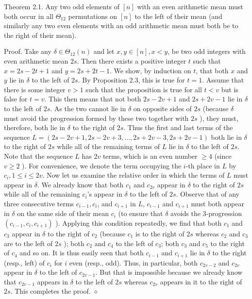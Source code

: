 \documentclass[10pt]{article}
\newcommand{\proofend}{\hfill\(\diamond\)}
\begin{document}
Theorem 2.1. Any two odd elements of $[n]$ with an even arithmetic mean must both occur in all $\Theta_{12}$ permutations on $[n]$ to the left of their mean (and similarly any two even elements with an odd arithmetic mean must both be to the right of their mean).

Proof. Take any $\delta \in \Theta_{12}(n)$ and let $x, y \in[n], x<y$, be two odd integers with even arithmetic mean $2 s$. Then there exists a positive integer $t$ such that $x=2 s-2 t+1$ and $y=2 s+2 t-1$. We show, by induction on $t$, that both $x$ and $y$ lie in $\delta$ to the left of $2 s$. By Proposition 2.3, this is true for $t=1$. Assume that there is some integer $v>1$ such that the proposition is true for all $t<v$ but is false for $t=v$. This then means that not both $2 s-2 v+1$ and $2 s+2 v-1$ lie in $\delta$ to the left of $2 s$. As the two cannot lie in $\delta$ on opposite sides of $2 s$ (because $\delta$ must avoid the progression formed by these two together with $2 s$ ), they must, therefore, both lie in $\delta$ to the right of $2 s$. Thus the first and last terms of the sequence $L=(2 s-2 v+1,2 s-2 v+3, \ldots, 2 s+2 v-3,2 s+2 v-1)$ both lie in $\delta$ to the right of $2 s$ while all of the remaining terms of $L$ lie in $\delta$ to the left of $2 s$. Note that the sequence $L$ has $2 v$ terms, which is an even number $\geq 4$ (since $v \geq 2$ ). For convenience, we denote the term occupying the $i$-th place in $L$ by $c_{i}, 1 \leq i \leq 2 v$. Now let us examine the relative order in which the terms of $L$ must appear in $\delta$. We already know that both $c_{1}$ and $c_{2 v}$ appear in $\delta$ to the right of $2 s$ while all of the remaining $c_i$'s appear in $\delta$ to the left of $2 s$. Observe that of any three consecutive terms $c_{i-1}, c_{i}$, and $c_{i+1}$ in $L$, $c_{i-1}$ and $c_{i+1}$ must both appear in $\delta$ on the same side of their mean $c_{i}$ (to ensure that $\delta$ avoids the 3-progression $\left(c_{i-1}, c_{i}, c_{i+1}\right)$ ). Applying this condition repeatedly, we find that both $c_{1}$ and $c_{3}$ appear in $\delta$ to the right of $c_{2}$ (because $c_{1}$ is to the right of $2 s$ whereas $c_{2}$ and $c_{3}$ are to the left of $2 s$ ); both $c_{2}$ and $c_{4}$ to the left of $c_{3}$; both $c_{3}$ and $c_{5}$ to the right of $c_{4}$ and so on. It is thus easily seen that both $c_{i-1}$ and $c_{i+1}$ lie in $\delta$ to the right (resp., left) of $c_{i}$ for $i$ even (resp., odd). Thus, in particular, both $c_{2 v-2}$ and $c_{2 v}$ appear in $\delta$ to the left of $c_{2 v-1}$. But that is impossible because we already know that $c_{2 v-1}$ appears in $\delta$ to the left of $2 s$ whereas $c_{2 v}$ appears in it to the right of $2 s$. This completes the proof. \proofend
\end{document}
